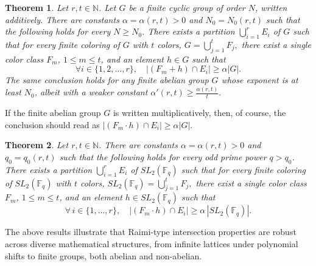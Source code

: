 \documentclass[11pt]{article}
\newtheorem{theorem}{Theorem}[section]
\newtheorem{remark}[theorem]{Remark}
\theoremstyle{definition}
\begin{document}
\begin{theorem}\label{thm3.1}Let $r, t\in \mathbb{N}$. Let $G$ be a finite cyclic group of order $N$, written additively. There are constants \(\alpha=\alpha(r, t)>0\) and \(N_0=N_0(r,t)\) such that the following holds for every \(N\ge N_0\). There exists a partition $\bigcup_{i=1}^rE_i$ of $G$ such that for every finite coloring of $G$ with $t$ colors,
$
G = \bigcup_{j=1}^t F_j,
$ there exist a single color class $F_m$, $1\le m\le t$, and an element $h\in G$ such that
\[\forall i\in\{1,2,
\ldots,r\},\quad |(F_m+h)\cap E_i|\ge \alpha |G|.\]
The same conclusion holds for any finite abelian group $G$ whose exponent is at least $N_0$, albeit with a weaker constant $\alpha'(r,t)\ge \frac{\alpha(r,t)}{t}.$
\end{theorem}

If the finite abelian group $G$ is written multiplicatively, then, of course, the conclusion should read as $|(F_m\cdot h)\cap E_i|\ge \alpha |G|$. 



\begin{theorem}\label{thm3.2}
Let $r, t\in \mathbb{N}$. There are constants \(\alpha=\alpha(r, t)>0\) and \(q_0=q_0(r,t)\) such that the following holds for every odd prime power \(q>q_0\). There exists a partition
$\bigcup_{i=1}^rE_i$ of $SL_2(\mathbb{F}_q)$
such that for every finite coloring of
$SL_2(\mathbb{F}_q)$ with $t$ colors,
$
SL_2(\mathbb{F}_q) = \bigcup_{j=1}^t F_j,
$
there exist a single color class $F_m$, $1\le m\le t$, and an element \(h\in SL_2(\mathbb{F}_q)\) such that
\[
\forall\, i\in\{1,\ldots, r\},\quad |(F_m\cdot h)\cap E_i|\ge \alpha\,|SL_2(\mathbb{F}_q)|.
\]
\end{theorem}

The above results illustrate that Raimi-type intersection properties are robust across diverse mathematical structures, from infinite lattices under polynomial shifts to finite groups, both abelian and non-abelian.
\end{document}
